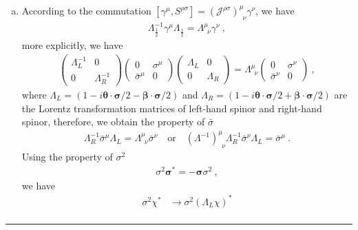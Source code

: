 \documentclass[12pt]{report}
\numberwithin{problemname}{chapter}
\newenvironment{solution}{\vspace{1em}\par\noindent{\large\textbf{\textsc{Solution}}}\par}{\vspace{1em}\hrule}
\begin{document}
\begin{solution}
\begin{enumerate}[(a)]
    \item According to the commutation $[\gamma^{\mu},S^{\rho\sigma}]=(\mathcal{J}^{\rho\sigma})^{\mu}_{\enspace\nu}\gamma^{\nu}$, we have
    \begin{align}
        \Lambda^{-1}_{\frac{1}{2}}\gamma^{\mu}\Lambda_{\frac{1}{2}}=\Lambda^{\mu}_{\enspace\nu}\gamma^{\nu}\ ,
    \end{align}
    more explicitly, we have
    \begin{align}
        \begin{pmatrix}
            \Lambda^{-1}_{L} & 0 \\
            0 & \Lambda^{-1}_{R}
        \end{pmatrix}
        \begin{pmatrix}
            0 & \sigma^{\mu} \\
            \bar{\sigma}^{\mu} & 0
        \end{pmatrix}
        \begin{pmatrix}
            \Lambda_{L} & 0 \\
            0 & \Lambda_{R}
        \end{pmatrix}
        =
        \Lambda^{\mu}_{\enspace\nu}
        \begin{pmatrix}
            0 & \sigma^{\nu} \\
            \bar{\sigma}^{\nu} & 0
        \end{pmatrix}\ ,
    \end{align}
    where $\Lambda_{L}=(1-i\bm{\theta}\cdot\bm{\sigma}/2-\bm{\beta}\cdot\bm{\sigma}/2)$ and $\Lambda_{R}=(1-i\bm{\theta}\cdot\bm{\sigma}/2+\bm{\beta}\cdot\bm{\sigma}/2)$ are the Lorentz transformation matrices of left-hand spinor and right-hand spinor, therefore, we obtain the property of $\bar{\sigma}$
    \begin{align}
        \Lambda^{-1}_{R}\bar{\sigma}^{\mu}\Lambda_{L}=\Lambda^{\mu}_{\enspace\nu}\bar{\sigma}^{\nu}\quad\text{or}\quad (\Lambda^{-1})^{\mu}_{\enspace\nu}\Lambda^{-1}_{R}\bar{\sigma}^{\nu}\Lambda_{L}=\bar{\sigma}^{\mu}\ .
    \end{align}
    Using the property of $\sigma^2$
    \begin{align}
        \sigma^2\bm{\sigma}^*=-\bm{\sigma}\sigma^2\ ,
    \end{align}
    we have
    \begin{align}
        \sigma^2\chi^*&\rightarrow\sigma^2(\Lambda_{L}\chi)^* \nonumber \\

\end{align}
\end{enumerate}
\end{solution}
\end{document}
